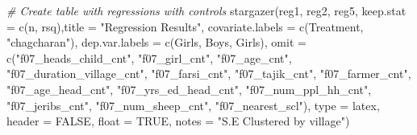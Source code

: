 \documentclass[
]{article}
\newenvironment{Shaded}{\begin{snugshade}}{\end{snugshade}}
\newcommand{\AttributeTok}[1]{\textcolor[rgb]{0.77,0.63,0.00}{#1}}
\newcommand{\CommentTok}[1]{\textcolor[rgb]{0.56,0.35,0.01}{\textit{#1}}}
\newcommand{\ConstantTok}[1]{\textcolor[rgb]{0.00,0.00,0.00}{#1}}
\newcommand{\FunctionTok}[1]{\textcolor[rgb]{0.00,0.00,0.00}{#1}}
\newcommand{\NormalTok}[1]{#1}
\newcommand{\StringTok}[1]{\textcolor[rgb]{0.31,0.60,0.02}{#1}}
\begin{document}
\begin{Shaded}
\begin{Highlighting}[]
\CommentTok{\# Create table with regressions with controls}
\FunctionTok{stargazer}\NormalTok{(reg1, reg2, reg5, }\AttributeTok{keep.stat =} \FunctionTok{c}\NormalTok{(}\StringTok{\textquotesingle{}n\textquotesingle{}}\NormalTok{, }\StringTok{\textquotesingle{}rsq\textquotesingle{}}\NormalTok{),}\AttributeTok{title =} \StringTok{"Regression Results"}\NormalTok{,}
          \AttributeTok{covariate.labels =} \FunctionTok{c}\NormalTok{(}\StringTok{\textquotesingle{}Treatment\textquotesingle{}}\NormalTok{, }\StringTok{"chagcharan"}\NormalTok{),}
          \AttributeTok{dep.var.labels =} \FunctionTok{c}\NormalTok{(}\StringTok{\textquotesingle{}Girls\textquotesingle{}}\NormalTok{, }\StringTok{\textquotesingle{}Boys\textquotesingle{}}\NormalTok{, }\StringTok{\textquotesingle{}Girls\textquotesingle{}}\NormalTok{), }
          \AttributeTok{omit =} \FunctionTok{c}\NormalTok{(}\StringTok{"f07\_heads\_child\_cnt"}\NormalTok{, }\StringTok{"f07\_girl\_cnt"}\NormalTok{, }\StringTok{"f07\_age\_cnt"}\NormalTok{, }\StringTok{"f07\_duration\_village\_cnt"}\NormalTok{, }\StringTok{"f07\_farsi\_cnt"}\NormalTok{, }\StringTok{"f07\_tajik\_cnt"}\NormalTok{, }\StringTok{"f07\_farmer\_cnt"}\NormalTok{, }\StringTok{"f07\_age\_head\_cnt"}\NormalTok{, }\StringTok{"f07\_yrs\_ed\_head\_cnt"}\NormalTok{, }\StringTok{"f07\_num\_ppl\_hh\_cnt"}\NormalTok{, }\StringTok{"f07\_jeribs\_cnt"}\NormalTok{, }\StringTok{"f07\_num\_sheep\_cnt"}\NormalTok{, }\StringTok{"f07\_nearest\_scl"}\NormalTok{),}
          \AttributeTok{type =} \StringTok{\textquotesingle{}latex\textquotesingle{}}\NormalTok{, }\AttributeTok{header =} \ConstantTok{FALSE}\NormalTok{, }\AttributeTok{float =} \ConstantTok{TRUE}\NormalTok{,  }\AttributeTok{notes =} \StringTok{"S.E Clustered by village"}\NormalTok{)}
\end{Highlighting}
\end{Shaded}
\end{document}
